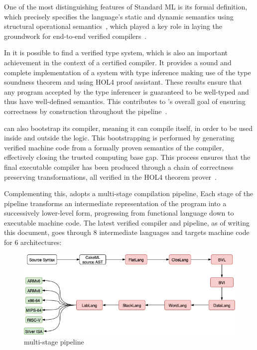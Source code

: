 One of the most distinguishing features of Standard ML is its formal definition, which precisely specifies the language's 
static and dynamic semantics using structural operational semantics~\cite{milner1997definition}, which played a key role in laying the 
groundwork for end-to-end verified compilers~\cite{Syme93}.

In \cml it is possible to find a verified type system, which is also an important achievement in the context of a certified compiler.
It provides a sound and complete implementation of a system with type inference making use of the type soundness theorem and using HOL4
proof assistant. These results ensure that any \cml program accepted by the type inferencer is guaranteed to be 
well-typed and thus have well-defined semantics. This contributes to \cml's overall goal of ensuring correctness by construction 
throughout the pipeline~\cite{TanOK15}.

\cml can also bootstrap its compiler, meaning it can compile itself, in order to be used inside and outside the logic. This 
bootstrapping is performed by generating verified machine code from a formally proven semantics of the compiler, effectively 
closing the trusted computing base gap. This process ensures that the final executable compiler has been produced through a 
chain of correctness preserving transformations, all verified in the HOL4 theorem prover~\cite{TanMKFON19, POPL14}.

Complementing this, \cml adopts a multi-stage compilation pipeline, Each stage of the pipeline transforms an intermediate representation
of the program into a successively lower-level form, progressing from functional language down to executable machine code. The latest 
verified \cml compiler and pipeline, as of writing this document, goes through 8 intermediate languages and targets machine code 
for 6 architectures:

\begin{figure}[H]
    \centering
    \includegraphics[width=\linewidth]{images/CakeMLPipeline.png}
    \caption{\cml multi-stage pipeline}
    \label{fig:CakeMLPipeline}
\end{figure}

